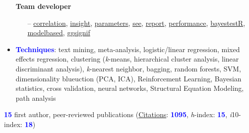 \documentclass[10pt]{article}
\begin{document}
\begin{itemize}
	 \textbf{Team developer}
	 \vspace*{-0.09in}
	
	\begin{itemize}	 
	
		\item[--] \href{https://easystats.github.io/correlation/}{correlation}, \href{https://easystats.github.io/insight/}{insight}, \href{https://easystats.github.io/parameters/}{parameters}, \href{https://easystats.github.io/see/}{see}, \href{https://easystats.github.io/report/}{report}, \href{https://easystats.github.io/performance/}{performance}, \href{https://easystats.github.io/bayestestR/}{bayestestR}, \href{https://easystats.github.io/modelbased/}{modelbased}, \href{https://const-ae.github.io/ggsignif/}{ggsignif}

	\end{itemize}

	\item \textcolor{blue}{\textbf{Techniques}}: text mining, meta-analysis, logistic/linear regression, mixed effects regression, clustering \hspace*{0.1in}(\textit{k}-means, hierarchical cluster analysis, linear discriminant analysis), \textit{k}-nearest neighbor, bagging, random \hspace*{0.1in}forests, SVM, dimensionality blueuction (PCA, ICA), Reinforcement Learning, Bayesian statistics, cross \hspace*{0.1in}validation, neural networks, Structural Equation Modeling, path analysis
	
	
    
    \end{itemize}
	

	
	\textbf{\textcolor{blue}{15}} first author, peer-reviewed publications (\href{https://scholar.google.it/citations?user=kSYuYTUAAAAJ&hl=en&oi=ao}{Citations}: \textbf{\textcolor{blue}{1095}}, \textit{h}-index: \textbf{\textcolor{blue}{15}}, \textit{i}10-index: \textbf{\textcolor{blue}{18}})\\
	
\end{document}
